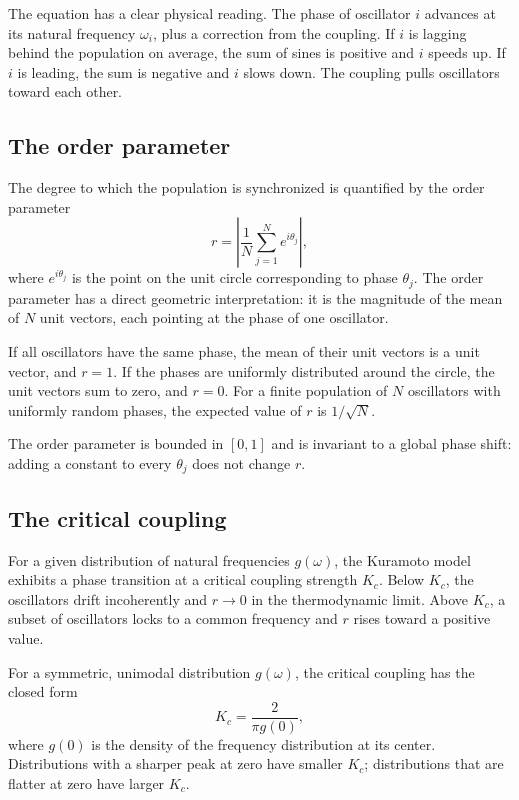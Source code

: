 \documentclass[11pt]{article}
\begin{document}
The equation has a clear physical reading. The phase of oscillator $i$
advances at its natural frequency $\omega_i$, plus a correction from
the coupling. If $i$ is lagging behind the population on average, the
sum of sines is positive and $i$ speeds up. If $i$ is leading, the sum
is negative and $i$ slows down. The coupling pulls oscillators toward
each other.

\subsection{The order parameter}

The degree to which the population is synchronized is quantified by the
order parameter
\begin{equation}
r = \left| \frac{1}{N} \sum_{j=1}^{N} e^{i\theta_j} \right|,
\label{eq:orderparam}
\end{equation}
where $e^{i\theta_j}$ is the point on the unit circle corresponding to
phase $\theta_j$. The order parameter has a direct geometric
interpretation: it is the magnitude of the mean of $N$ unit vectors,
each pointing at the phase of one oscillator.

If all oscillators have the same phase, the mean of their unit vectors
is a unit vector, and $r = 1$. If the phases are uniformly distributed
around the circle, the unit vectors sum to zero, and $r = 0$. For a
finite population of $N$ oscillators with uniformly random phases, the
expected value of $r$ is $1/\sqrt{N}$.

The order parameter is bounded in $[0,1]$ and is invariant to a global
phase shift: adding a constant to every $\theta_j$ does not change $r$.

\subsection{The critical coupling}

For a given distribution of natural frequencies $g(\omega)$, the
Kuramoto model exhibits a phase transition at a critical coupling
strength $K_c$. Below $K_c$, the oscillators drift incoherently and
$r \to 0$ in the thermodynamic limit. Above $K_c$, a subset of
oscillators locks to a common frequency and $r$ rises toward a positive
value.

For a symmetric, unimodal distribution $g(\omega)$, the critical
coupling has the closed form
\begin{equation}
K_c = \frac{2}{\pi g(0)},
\label{eq:critical}
\end{equation}
where $g(0)$ is the density of the frequency distribution at its
center. Distributions with a sharper peak at zero have smaller $K_c$;
distributions that are flatter at zero have larger $K_c$.
\end{document}
